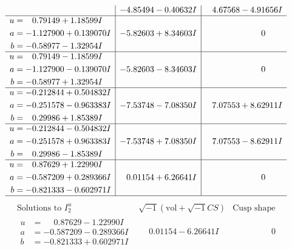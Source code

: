 \documentclass[1p]{elsarticle_modified}
\theoremstyle{definition}
\newcommand{\I}{\sqrt{-1}}
\begin{document}
$$\begin{array}{c|c|c}
 & -4.85494 - 0.40632 I & \phantom{-}4.67568 - 4.91656 I \\ \hline\begin{aligned}
u &= \phantom{-}0.79149 + 1.18599 I \\
a &= -1.127900 + 0.139070 I \\
b &= -0.58977 - 1.32954 I\end{aligned}
 & -5.82603 + 8.34603 I & \phantom{-0.000000 } 0 \\ \hline\begin{aligned}
u &= \phantom{-}0.79149 - 1.18599 I \\
a &= -1.127900 - 0.139070 I \\
b &= -0.58977 + 1.32954 I\end{aligned}
 & -5.82603 - 8.34603 I & \phantom{-0.000000 } 0 \\ \hline\begin{aligned}
u &= -0.212844 + 0.504832 I \\
a &= -0.251578 - 0.963383 I \\
b &= \phantom{-}0.29986 + 1.85389 I\end{aligned}
 & -7.53748 - 7.08350 I & \phantom{-}7.07553 + 8.62911 I \\ \hline\begin{aligned}
u &= -0.212844 - 0.504832 I \\
a &= -0.251578 + 0.963383 I \\
b &= \phantom{-}0.29986 - 1.85389 I\end{aligned}
 & -7.53748 + 7.08350 I & \phantom{-}7.07553 - 8.62911 I \\ \hline\begin{aligned}
u &= \phantom{-}0.87629 + 1.22990 I \\
a &= -0.587209 + 0.289366 I \\
b &= -0.821333 - 0.602971 I\end{aligned}
 & \phantom{-}0.01154 + 6.26641 I & \phantom{-0.000000 } 0\\
 \hline 
 \end{array}$$\newpage$$\begin{array}{c|c|c}  
\text{Solutions to }I^u_{2}& \I (\text{vol} + \sqrt{-1}CS) & \text{Cusp shape}\\
 \hline 
\begin{aligned}
u &= \phantom{-}0.87629 - 1.22990 I \\
a &= -0.587209 - 0.289366 I \\
b &= -0.821333 + 0.602971 I\end{aligned}
 & \phantom{-}0.01154 - 6.26641 I & \phantom{-0.000000 } 0 \\ \hline\begin{aligned}

\end{aligned}
\end{array}$$
\end{document}
